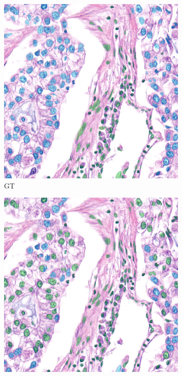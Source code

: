 \begin{figure}[H]
    \centering
    \begin{subfigure}[b]{0.3\textwidth}
    \includegraphics[width=\textwidth]{imgs/qual/lung/val-gt1.overlay.png}
    \caption{GT}
  \end{subfigure}
  \begin{subfigure}[b]{0.3\textwidth}
    \includegraphics[width=\textwidth]{imgs/qual/lung/val-hov1.png}

\end{subfigure}
\end{figure}
